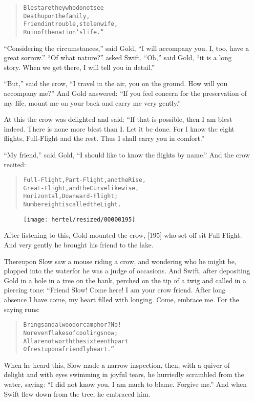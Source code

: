 \documentclass[article, twoside, 10pt]{memoir}
\renewenvironment{verbatim}{%
\begin{quote}%
\vskip -10pt%
\begin{alltt}\normalfont\small}{\end{alltt}%
\end{quote}%
\vskip -10pt
} %
\begin{document}
\begin{verbatim}
Blest are they who do not see
Death upon the family,
Friend in trouble, stolen wife,
Ruin of the nation's life.”
\end{verbatim}
``Considering the circumstances,'' said Gold,
``I will accompany you. I, too, have a great sorrow.''
``Of what nature?'' asked Swift. ``Oh,'' said Gold,
``it is a long story. When we get there, I will tell you in detail.''

``But,'' said the crow,
``I travel in the air, you on the ground. How will you accompany me?''
And Gold answered:
``If you feel concern for the preservation of my life, mount me on your back and carry me very gently.''

At this the crow was delighted and said:
``If that is possible, then I am blest indeed. There is none more blest than I. Let it be done. For I know the eight flights, Full-Flight and the rest. Thus I shall carry you in comfort.''

``My friend,'' said Gold,
``I should like to know the flights by name.'' And the crow
recited:

\begin{verbatim}
Full-Flight, Part-Flight, and the Rise,
Great-Flight, and the Curve likewise,
Horizontal, Downward-Flight;
Number eight is called the Light.
\end{verbatim}
\begin{figure}[p]\texttt{[image: hertel/resized/00000195]}\end{figure}After listening to this, Gold mounted the crow, [195] who set off
sit Full-Flight. And very gently he brought his friend to the
lake.

Thereupon Slow saw a mouse riding a crow, and wondering who he
might be, plopped into the water{\textemdash}for he was a judge of occasions.
And Swift, after depositing Gold in a hole in a tree on the bank,
perched on the tip of a twig and called in a piercing tone: “Friend
Slow! Come here! I am your crow friend. After long absence I have
come, my heart filled with longing. Come, embrace me. For the
saying runs:

\begin{verbatim}
Bring sandalwood or camphor? No!
Nor even flakes of cooling snow;
All are not worth the sixteenth part
Of rest upon a friendly heart.”
\end{verbatim}
When he heard this, Slow made a narrow inspection, then, with a
quiver of delight and with eyes swimming in joyful tears, he
hurriedly scrambled from the water, saying:
``I did not know you. I am much to blame. Forgive me.'' And when
Swift flew down from the tree, he embraced him.
\end{document}
